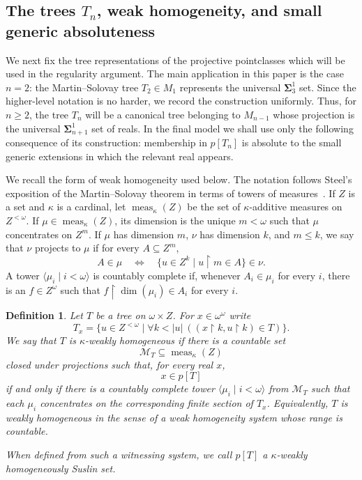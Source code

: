 \documentclass[a4paper,11pt]{article}
\newtheorem{definition}[theorem]{Definition}
\begin{document}
\subsection{The trees $T_n$, weak homogeneity, and small generic absoluteness}\label{subsec:tn-weak-homogeneity}

We next fix the tree representations of the projective pointclasses which will be used in the regularity argument.  The main application in this paper is the case $n=2$: the Martin--Solovay tree $T_2\in M_1$ represents the universal $\boldsymbol{\Sigma}^1_3$ set.  Since the higher-level notation is no harder, we record the construction uniformly.  Thus, for $n\geq 2$, the tree $T_n$ will be a canonical tree belonging to $M_{n-1}$ whose projection is the universal $\boldsymbol{\Sigma}^1_{n+1}$ set of reals.  In the final model we shall use only the following consequence of its construction: membership in $p[T_n]$ is absolute to the small generic extensions in which the relevant real appears.

We recall the form of weak homogeneity used below.  The notation follows Steel's exposition of the Martin--Solovay theorem in terms of towers of measures~\cite{steel2009derived}.  If $Z$ is a set and $\kappa$ is a cardinal, let $\operatorname{meas}_\kappa(Z)$ be the set of $\kappa$-additive measures on $Z^{<\omega}$.  If $\mu\in\operatorname{meas}_\kappa(Z)$, its dimension is the unique $m<\omega$ such that $\mu$ concentrates on $Z^m$.  If $\mu$ has dimension $m$, $\nu$ has dimension $k$, and $m\leq k$, we say that $\nu$ projects to $\mu$ if for every $A\subseteq Z^m$,
\[
   A\in\mu
   \quad\Longleftrightarrow\quad
   \{u\in Z^k\mid u\upharpoonright m\in A\}\in\nu .
\]
A tower $\langle\mu_i\mid i<\omega\rangle$ is countably complete if, whenever $A_i\in\mu_i$ for every $i$, there is an $f\in Z^\omega$ such that $f\upharpoonright\operatorname{dim}(\mu_i)\in A_i$ for every $i$.

\begin{definition}\label{def:weakly-homogeneous-tree}
Let $T$ be a tree on $\omega\times Z$.  For $x\in\omega^\omega$ write
\[
   T_x=\{u\in Z^{<\omega}\mid \forall k<|u|\ ((x\upharpoonright k,u\upharpoonright k)\in T)\}.
\]
We say that $T$ is \emph{$\kappa$-weakly homogeneous} if there is a countable set
\[
   \mathcal M_T\subseteq\operatorname{meas}_\kappa(Z)
\]
closed under projections such that, for every real $x$,
\[
   x\in p[T]
\]
if and only if there is a countably complete tower $\langle\mu_i\mid i<\omega\rangle$ from $\mathcal M_T$ such that each $\mu_i$ concentrates on the corresponding finite section of $T_x$.  Equivalently, $T$ is weakly homogeneous in the sense of a weak homogeneity system whose range is countable.

When defined from such a witnessing system, we call $p[T]$ a $\kappa$-weakly homogeneously Suslin set.
\end{definition}
\end{document}
